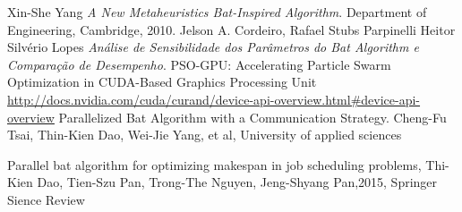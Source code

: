 \documentclass[conference]{IEEEtran}
\begin{document}
\begin{thebibliography}{1}

    Xin-She Yang \emph{A New Metaheuristics Bat-Inspired Algorithm}. Department of Engineering, Cambridge, 2010.
    Jelson A. Cordeiro, Rafael Stubs Parpinelli Heitor Silvério Lopes \emph{Análise de Sensibilidade dos Parâmetros do Bat Algorithm e Comparação de Desempenho}.
    PSO-GPU: Accelerating Particle Swarm Optimization in CUDA-Based Graphics Processing Unit
    \url{http://docs.nvidia.com/cuda/curand/device-api-overview.html#device-api-overview}
    Parallelized Bat Algorithm with a Communication Strategy. Cheng-Fu Tsai, Thin-Kien Dao, Wei-Jie Yang, et al, University of applied sciences

    Parallel bat algorithm for optimizing makespan in job scheduling problems, Thi-Kien Dao, Tien-Szu Pan, Trong-The Nguyen, Jeng-Shyang Pan,2015, Springer Sience Review

\end{thebibliography}
\end{document}
